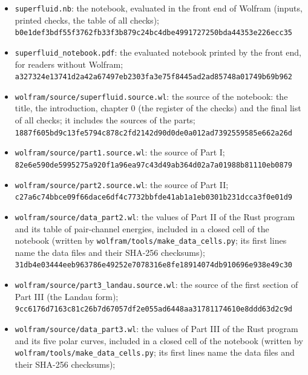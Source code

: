 \documentclass[
  10pt,
]{article}
\providecommand{\tightlist}{%
  \setlength{\itemsep}{0pt}\setlength{\parskip}{0pt}}
\begin{document}
\begin{itemize}
\tightlist
\item
  \texttt{superfluid.nb}: the notebook, evaluated in the front end of
  Wolfram (inputs, printed checks, the table of all checks);\\
  \texttt{b0e1def3bdf55f3762fb33f3b879c24bc4dbe4991727250bda44353e226ecc35}
\item
  \texttt{superfluid\_notebook.pdf}: the evaluated notebook printed by
  the front end, for readers without Wolfram;\\
  \texttt{a327324e13741d2a42a67497eb2303fa3e75f8445ad2ad85748a01749b69b962}
\item
  \texttt{wolfram/source/superfluid.source.wl}: the source of the
  notebook: the title, the introduction, chapter 0 (the register of the
  checks) and the final list of all checks; it includes the sources of
  the parts;\\
  \texttt{1887f605bd9c13fe5794c878c2fd2142d90d0de0a012ad7392559585e662a26d}
\item
  \texttt{wolfram/source/part1.source.wl}: the source of Part I;\\
  \texttt{82e6e590de5995275a920f1a96ea97c43d49ab364d02a7a01988b81110eb0879}
\item
  \texttt{wolfram/source/part2.source.wl}: the source of Part II;\\
  \texttt{c27a6c74bbce09f66dace6df4c7732bbfde41ab1a1eb0301b231dcca3f0e01d9}
\item
  \texttt{wolfram/source/data\_part2.wl}: the values of Part II of the
  Rust program and its table of pair-channel energies, included in a
  closed cell of the notebook (written by
  \texttt{wolfram/tools/make\_data\_cells.py}; its first lines name the
  data files and their SHA-256 checksums);\\
  \texttt{31db4e03444eeb963786e49252e7078316e8fe18914074db910696e938e49c30}
\item
  \texttt{wolfram/source/part3\_landau.source.wl}: the source of the
  first section of Part III (the Landau form);\\
  \texttt{9cc6176d7163c81c26b7d67057df2e055ad6448aa31781174610e8ddd63d2c9d}
\item
  \texttt{wolfram/source/data\_part3.wl}: the values of Part III of the
  Rust program and its five polar curves, included in a closed cell of
  the notebook (written by \texttt{wolfram/tools/make\_data\_cells.py};
  its first lines name the data files and their SHA-256 checksums);\\

\end{itemize}
\end{document}
